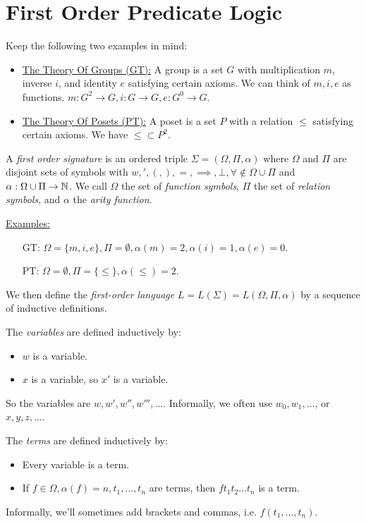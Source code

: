 \documentclass[10pt,a4paper]{article}
\begin{document}
\section{First Order Predicate Logic}
Keep the following two examples in mind:
\begin{itemize}
\item \underline{The Theory Of Groups (GT):} A group is a set $G$ with multiplication $m$, inverse $i$, and identity $e$ satisfying certain axioms. We can think of $m,i, e$ as functions. $m:G^2 \to G, i: G \to G, e: G^0 \to G$.
\item \underline{The Theory Of Posets (PT):} A poset is a set $P$ with a relation $\leq$ satisfying certain axioms. We have $\leq \subset P^2$.
\end{itemize}

A \emph{first order signature} is an ordered triple $\Sigma = (\Omega, \Pi, \alpha)$ where $\Omega$ and $\Pi$ are disjoint sets of symbols with $w, ', (, ), =, \implies, \bot, \forall \notin \Omega \cup \Pi$ and $\alpha : \Omega \cup \Pi \to \mathbb{N}$. We call $\Omega$ the set of \emph{function symbols}, $\Pi$ the set of \emph{relation symbols}, and $\alpha$ the \emph{arity function}.

\hspace*{-1em}\underline{Examples:}
\begin{itemize}
\item[GT:] $\Omega = \{m,i,e\}, \Pi = \emptyset, \alpha(m) = 2, \alpha(i) = 1, \alpha(e) = 0$.
\item[PT:] $\Omega = \emptyset, \Pi = \{\leq\}, \alpha(\leq) = 2$.
\end{itemize}

We then define the \emph{first-order language} $L = L(\Sigma) = L(\Omega, \Pi, \alpha)$ by a sequence of inductive definitions.

The \emph{variables} are defined inductively by:
\begin{itemize}
\item $w$ is a variable.
\item $x$ is a variable, so $x'$ is a variable.
\end{itemize}
So the variables are $w, w', w'', w''', \ldots$. Informally, we often use $w_0, w_1, \ldots$, or $x, y, z, \ldots$.

The \emph{terms} are defined inductively by:
\begin{itemize}
\item Every variable is a term.
\item If $f \in \Omega, \alpha(f) = n, t_1, \ldots, t_n$ are terms, then $ft_1t_2\ldots t_n$ is a term.
\end{itemize}
Informally, we'll sometimes add brackets and commas, i.e. $f(t_1, \ldots, t_n)$.
\end{document}
